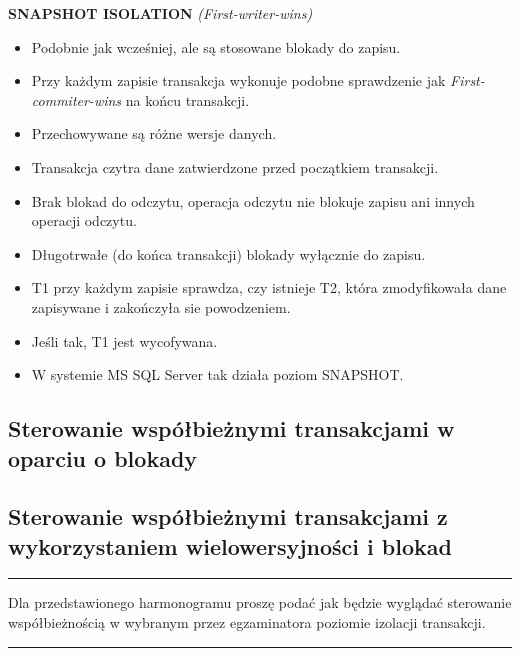 \documentclass[a5paper,6pt]{article}
\newcommand{\horrule}[1]{\rule{\linewidth}{#1}}
\begin{document}
    \textbf{SNAPSHOT ISOLATION} \textit{(First-writer-wins)}\\
    \begin{itemize}
        \item Podobnie jak wcześniej, ale są stosowane blokady do zapisu.
        \item Przy każdym zapisie transakcja wykonuje podobne sprawdzenie jak
              \textit{First-commiter-wins} na końcu transakcji.
        \item Przechowywane są różne wersje danych.
        \item Transakcja czytra dane zatwierdzone przed początkiem transakcji.
        \item Brak blokad do odczytu, operacja odczytu nie blokuje zapisu ani
              innych operacji odczytu.
        \item Długotrwałe (do końca transakcji) blokady wyłącznie do zapisu.
        \item T1 przy każdym zapisie sprawdza, czy istnieje T2, która
              zmodyfikowała dane zapisywane i zakończyła sie powodzeniem.
        \item Jeśli tak, T1 jest wycofywana.
        \item W systemie MS SQL Server tak działa poziom SNAPSHOT.
    \end{itemize}


    \subsection{Sterowanie współbieżnymi transakcjami w oparciu o blokady}
    \label{sub:sterowanie_wspolbieznymi_blokady}


    \subsection{Sterowanie współbieżnymi transakcjami z wykorzystaniem
    wielowersyjności i blokad} %
    \label{sub:sterowanie_wspolbieznymi_wielowier}

    \horrule{0.5pt}
    Dla przedstawionego harmonogramu proszę podać jak będzie wyglądać sterowanie
    współbieżnością w wybranym przez egzaminatora poziomie izolacji
    transakcji.\\
    \horrule{0.5pt}
\end{document}
